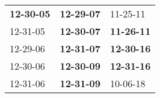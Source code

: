 \begin{supertabular}{p{0.33\columnwidth}p{0.33\columnwidth}p{0.33\columnwidth}}
 \textbf{12-30-05\textsuperscript{}} &  \textbf{12-29-07\textsuperscript{}} &           11-25-11\textsuperscript{} \\
          12-31-05\textsuperscript{} &  \textbf{12-30-07\textsuperscript{}} &  \textbf{11-26-11\textsuperscript{}} \\
          12-29-06\textsuperscript{} &  \textbf{12-31-07\textsuperscript{}} &  \textbf{12-30-16\textsuperscript{}} \\
          12-30-06\textsuperscript{} &  \textbf{12-30-09\textsuperscript{}} &  \textbf{12-31-16\textsuperscript{}} \\
          12-31-06\textsuperscript{} &  \textbf{12-31-09\textsuperscript{}} &           10-06-18\textsuperscript{} \\
\end{supertabular}
